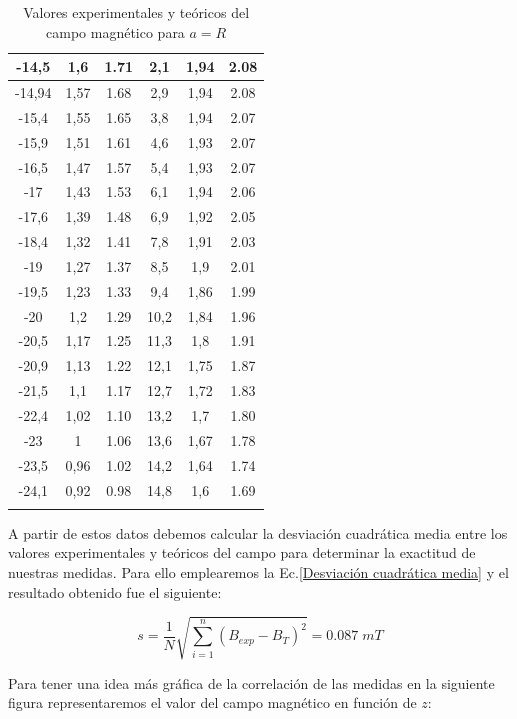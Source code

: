 \documentclass[a4paper,12pt,titlepage]{report}
\begin{document}
\begin{longtable}[t]{|c|c|c|c|c|c|}
    -14,5  & 1,6  & 1.71 & 2,1   & 1,94 & 2.08 \\ \hline
    -14,94 & 1,57 & 1.68 & 2,9   & 1,94 & 2.08 \\ \hline
    -15,4  & 1,55 & 1.65 & 3,8   & 1,94 & 2.07 \\ \hline
    -15,9  & 1,51 & 1.61 & 4,6   & 1,93 & 2.07 \\ \hline
    -16,5  & 1,47 & 1.57 & 5,4   & 1,93 & 2.07 \\ \hline
    -17    & 1,43 & 1.53 & 6,1   & 1,94 & 2.06 \\ \hline
    -17,6  & 1,39 & 1.48 & 6,9   & 1,92 & 2.05 \\ \hline
    -18,4  & 1,32 & 1.41 & 7,8   & 1,91 & 2.03 \\ \hline
    -19    & 1,27 & 1.37 & 8,5   & 1,9  & 2.01 \\ \hline
    -19,5  & 1,23 & 1.33 & 9,4   & 1,86 & 1.99 \\ \hline
    -20    & 1,2  & 1.29 & 10,2  & 1,84 & 1.96 \\ \hline
    -20,5  & 1,17 & 1.25 & 11,3  & 1,8  & 1.91 \\ \hline
    -20,9  & 1,13 & 1.22 & 12,1  & 1,75 & 1.87 \\ \hline
    -21,5  & 1,1  & 1.17 & 12,7  & 1,72 & 1.83 \\ \hline
    -22,4  & 1,02 & 1.10 & 13,2  & 1,7  & 1.80 \\ \hline
    -23    & 1    & 1.06 & 13,6  & 1,67 & 1.78 \\ \hline
    -23,5  & 0,96 & 1.02 & 14,2  & 1,64 & 1.74 \\ \hline
    -24,1  & 0,92 & 0.98 & 14,8  & 1,6  & 1.69 \\ \hline
    \caption{Valores experimentales y teóricos del campo magnético para $a=R$}
    \label{Datos aR}
\end{longtable}


A partir de estos datos debemos calcular la desviación cuadrática media entre los valores experimentales y teóricos del campo para determinar la exactitud de nuestras medidas. Para ello emplearemos la Ec.\ref{Desviación cuadrática media} y el resultado obtenido fue el siguiente:

\begin{equation}
    s = \frac{1}{N} \sqrt{\sum_{i=1}^{n} (B_{exp} - B_T)^2} = 0.087 \; mT
\end{equation}

Para tener una idea más gráfica de la correlación de las medidas en la siguiente figura representaremos el valor del campo magnético en función de $z$:
\end{document}
